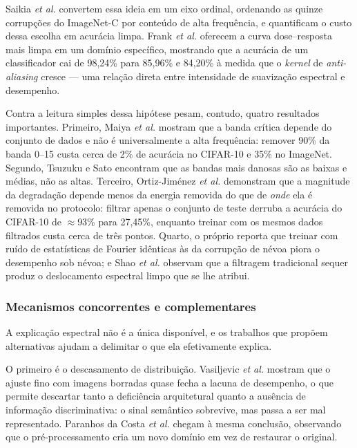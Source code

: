 \documentclass[conference]{IEEEtran}
\begin{document}
Saikia \textit{et al.} \cite{b20} convertem essa ideia em um eixo ordinal,
ordenando as quinze corrupções do ImageNet-C por conteúdo de alta frequência, e
quantificam o custo dessa escolha em acurácia limpa. Frank \textit{et al.}
\cite{b21} oferecem a curva dose--resposta mais limpa em um domínio específico,
mostrando que a acurácia de um classificador cai de 98,24\% para 85,96\% e 
84,20\% à medida que o \textit{kernel} de \textit{anti-aliasing} cresce --- 
uma relação direta entre intensidade de suavização espectral e desempenho.

Contra a leitura simples dessa hipótese pesam, contudo, quatro resultados
importantes. Primeiro, Maiya \textit{et al.} \cite{b22} mostram que a banda 
crítica depende do conjunto de dados e não é universalmente a alta frequência: 
remover 90\% da banda 0--15 custa cerca de 2\% de acurácia no CIFAR-10 e 35\% no 
ImageNet. Segundo, Tsuzuku e Sato \cite{b19} encontram que as bandas mais danosas 
são as baixas e médias, não as altas. Terceiro, Ortiz-Jiménez \textit{et al.}
\cite{b23} demonstram que a magnitude da degradação depende menos da energia
removida do que de \emph{onde} ela é removida no protocolo: filtrar apenas o 
conjunto de teste derruba a acurácia do CIFAR-10 de $\approx$93\% para 27,45\%, 
enquanto treinar com os mesmos dados filtrados custa cerca de três pontos. 
Quarto, o próprio \cite{b18} reporta que treinar com ruído de estatísticas de Fourier 
idênticas às da corrupção de névoa piora o desempenho sob névoa; e Shao \textit{et al.}
\cite{b24} observam que a filtragem tradicional sequer produz o deslocamento
espectral limpo que se lhe atribui.

\subsubsection{Mecanismos concorrentes e complementares}

A explicação espectral não é a única disponível, e os trabalhos que propõem
alternativas ajudam a delimitar o que ela efetivamente explica.

O primeiro é o descasamento de distribuição. Vasiljevic \textit{et al.}
\cite{b4} mostram que o ajuste fino com imagens borradas quase fecha a lacuna
de desempenho, o que permite descartar tanto a deficiência arquitetural quanto
a ausência de informação discriminativa: o sinal semântico sobrevive, mas 
passa a ser mal representado. Paranhos da Costa \textit{et al.} \cite{b8}
chegam à mesma conclusão, observando que o pré-processamento cria um 
novo domínio em vez de restaurar o original.
\end{document}
